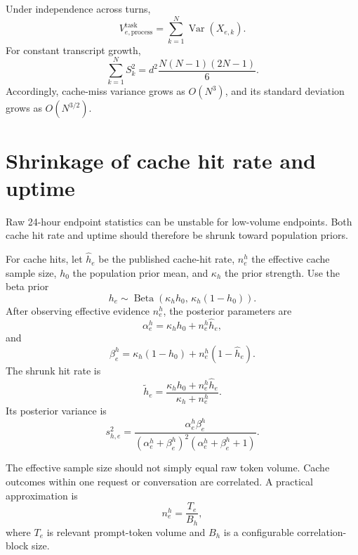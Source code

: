 \documentclass[11pt]{article}
\newcommand{\Var}{\operatorname{Var}}
\begin{document}
Under independence across turns,
\begin{equation}
\boxed{
V_{e,\mathrm{process}}^{\mathrm{task}}
=\sum_{k=1}^{N}\Var(X_{e,k})
}.
\end{equation}
For constant transcript growth,
\begin{equation}
\sum_{k=1}^{N}S_k^2
=d^2\frac{N(N-1)(2N-1)}{6}.
\end{equation}
Accordingly, cache-miss variance grows as $O(N^3)$, and its standard deviation
grows as $O(N^{3/2})$.

\section{Shrinkage of cache hit rate and uptime}

Raw 24-hour endpoint statistics can be unstable for low-volume endpoints. Both
cache hit rate and uptime should therefore be shrunk toward population priors.

For cache hits, let $\hat h_e$ be the published cache-hit rate, $n_e^h$ the
effective cache sample size, $h_0$ the population prior mean, and $\kappa_h$
the prior strength. Use the beta prior
\begin{equation}
h_e\sim\operatorname{Beta}
\left(\kappa_hh_0,\,\kappa_h(1-h_0)\right).
\end{equation}
After observing effective evidence $n_e^h$, the posterior parameters are
\begin{equation}
\alpha_e^h=\kappa_hh_0+n_e^h\hat h_e,
\end{equation}
and
\begin{equation}
\beta_e^h=\kappa_h(1-h_0)+n_e^h(1-\hat h_e).
\end{equation}
The shrunk hit rate is
\begin{equation}
\boxed{
\tilde h_e
=\frac{\kappa_hh_0+n_e^h\hat h_e}{\kappa_h+n_e^h}
}.
\end{equation}
Its posterior variance is
\begin{equation}
\boxed{
s_{h,e}^2
=\frac{\alpha_e^h\beta_e^h}
{(\alpha_e^h+\beta_e^h)^2(\alpha_e^h+\beta_e^h+1)}
}.
\end{equation}

The effective sample size should not simply equal raw token volume. Cache outcomes
within one request or conversation are correlated. A practical approximation is
\begin{equation}
n_e^h=\frac{T_e}{B_h},
\end{equation}
where $T_e$ is relevant prompt-token volume and $B_h$ is a configurable
correlation-block size.
\end{document}
